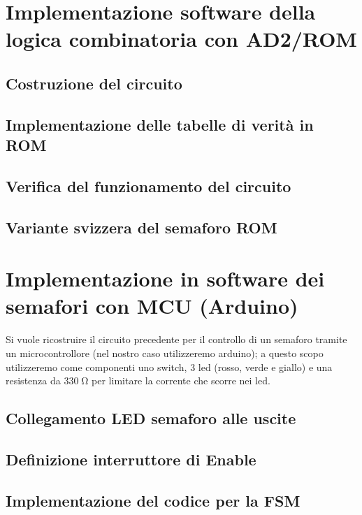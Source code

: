 \documentclass[10pt, a4paper, italian]{article}
\begin{document}
\section{Implementazione software della logica combinatoria con AD2/ROM}
\subsection{Costruzione del circuito}

\subsection{Implementazione delle tabelle di verità in ROM}

\subsection{Verifica del funzionamento del circuito}

\subsection{Variante svizzera del semaforo ROM}

\section{Implementazione in software dei semafori con MCU (Arduino)}
Si vuole ricostruire il circuito precedente per il controllo di un semaforo tramite un microcontrollore (nel nostro caso utilizzeremo arduino); a questo scopo utilizzeremo come componenti uno switch, 3 led (rosso, verde e giallo) e una resistenza da
$330 \; \si{\ohm}$ per limitare la corrente che scorre nei led.

\subsection{Collegamento LED semaforo alle uscite}

\subsection{Definizione interruttore di Enable}

\subsection{Implementazione del codice per la FSM}
\end{document}

